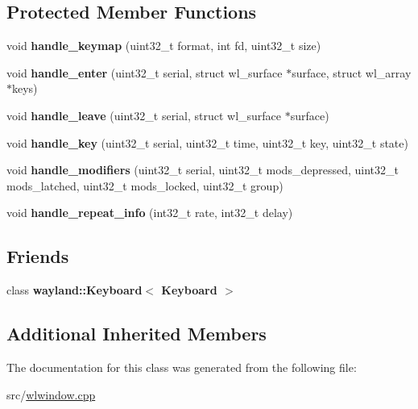 \subsection*{Protected Member Functions}
\begin{DoxyCompactItemize}
\item 
\mbox{\label{classwlwin_1_1Keyboard_a36d1737068435ccdf1089b4f03d3fa33}} 
void {\bfseries handle\+\_\+keymap} (uint32\+\_\+t format, int fd, uint32\+\_\+t size)
\item 
\mbox{\label{classwlwin_1_1Keyboard_ac039495d722facda37fb55dc41142780}} 
void {\bfseries handle\+\_\+enter} (uint32\+\_\+t serial, struct wl\+\_\+surface $\ast$surface, struct wl\+\_\+array $\ast$keys)
\item 
\mbox{\label{classwlwin_1_1Keyboard_a891024118c361347b5376bf72b2c9d1b}} 
void {\bfseries handle\+\_\+leave} (uint32\+\_\+t serial, struct wl\+\_\+surface $\ast$surface)
\item 
\mbox{\label{classwlwin_1_1Keyboard_aa638582aeda53678a700836dacce6141}} 
void {\bfseries handle\+\_\+key} (uint32\+\_\+t serial, uint32\+\_\+t time, uint32\+\_\+t key, uint32\+\_\+t state)
\item 
\mbox{\label{classwlwin_1_1Keyboard_a097bc28e3f7368eb2bd1386238538cc5}} 
void {\bfseries handle\+\_\+modifiers} (uint32\+\_\+t serial, uint32\+\_\+t mods\+\_\+depressed, uint32\+\_\+t mods\+\_\+latched, uint32\+\_\+t mods\+\_\+locked, uint32\+\_\+t group)
\item 
\mbox{\label{classwlwin_1_1Keyboard_a468b28ab925f12e0dfce5d19a2d7cffe}} 
void {\bfseries handle\+\_\+repeat\+\_\+info} (int32\+\_\+t rate, int32\+\_\+t delay)
\end{DoxyCompactItemize}
\subsection*{Friends}
\begin{DoxyCompactItemize}
\item 
\mbox{\label{classwlwin_1_1Keyboard_ac31b40bd6bbad91f8f449d0156026f7a}} 
class {\bfseries wayland\+::\+Keyboard$<$ Keyboard $>$}
\end{DoxyCompactItemize}
\subsection*{Additional Inherited Members}


The documentation for this class was generated from the following file\+:\begin{DoxyCompactItemize}
\item 
src/\mbox{\hyperlink{wlwindow_8cpp}{wlwindow.\+cpp}}\end{DoxyCompactItemize}
